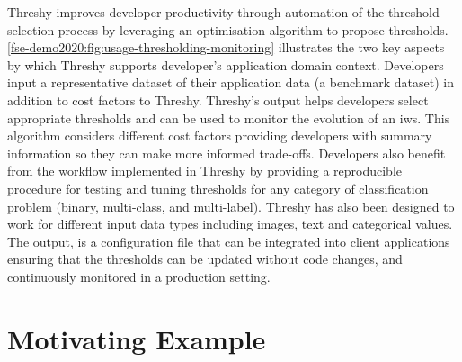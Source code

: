 Threshy improves developer productivity through automation of the threshold selection process by leveraging an optimisation algorithm to propose thresholds. \cref{fse-demo2020:fig:usage-thresholding-monitoring} illustrates the two key aspects by which Threshy supports developer's application domain context. Developers input a representative dataset of their application data (a benchmark dataset) in addition to cost factors to Threshy. Threshy's output helps developers select appropriate thresholds and can be used to monitor the evolution of an \gls{iws}.%
This algorithm considers different cost factors providing developers with summary information so they can make more informed trade-offs. Developers also benefit from the workflow implemented in Threshy by providing a reproducible procedure for testing and tuning thresholds for any category of classification problem (binary, multi-class, and multi-label). Threshy has also been designed to work for different input data types including images, text and categorical values. The output, is a configuration file that can be integrated into client applications ensuring that the thresholds can be updated without code changes, and continuously monitored in a production setting. 



\section{Motivating Example}
\label{fse-demo2020:sec:motivating-example}

